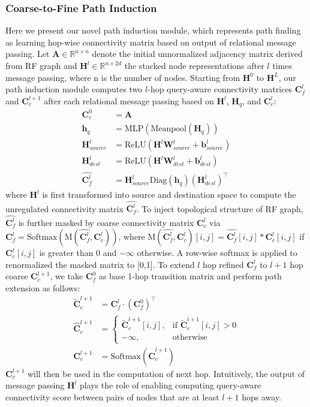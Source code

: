 \subsubsection{Coarse-to-Fine Path Induction}
Here we present our novel path induction module, which represents path finding as learning hop-wise connectivity matrix based on output of relational message passing.
Let $\bm{A}\in \mathbb{R}^{n\times n}$ denote the initial unnormalized adjacency matrix derived from RF graph and $\bm{H}^l\in \mathbb{R}^{n\times 2d}$ the stacked node representations after $l$ times message passing, where n is the number of nodes. Starting from $\bm{H}^0$ to $\bm{H}^L$, our path induction module computes two $l$-hop query-aware connectivity matrices $\bm{C}_{f}^l$ and $\bm{C}_c^{l+1}$ after each relational message passing based on $\bm{H}^{l}$, $\bm{H}_q$, and $\bm{C}_c^{l}$:
\begin{align}
	\bm{C}_c^0 &= \bm{A}\\
	\bm{h}_q &= \text{MLP}(\text{Meanpool}(\bm{H}_q)) \\ 
	\bm{H}_{source}^l &= \text{ReLU}(\bm{H}^l\bm{W}_{source}^l+\bm{b}_{source}^l)\\
	\bm{H}_{dest}^l &= \text{ReLU}(\bm{H}^l\bm{W}_{dest}^l+\bm{b}_{dest}^l)\\
	\hat{\bm{C}_f^l} &=  \bm{H}_{source}^l \text{Diag}(\bm{h}_q) (\bm{H}_{dest}^l)^\top
\end{align}
where $\bm{H}^l$ is first transformed into source and destination space to compute the unregulated connectivity matrix $\hat{\bm{C}_f^l}$. To inject topological structure of RF graph, $\hat{\bm{C}_f^l}$ is further masked by coarse connectivity matrix $\bm{C}_c^{l}$ via $\bm{C}_{f}^l=\text{Softmax}(\text{M}(\hat{\bm{C}_f^l}, \bm{C}_c^{l}))$, where $\text{M}(\hat{\bm{C}_f^l}, \bm{C}_c^{l})[i,j]=\hat{\bm{C}_f^l}[i,j]*\bm{C}_c^{l}[i,j]$ if $\bm{C}_c^{l}[i,j]$ is greater than 0 and $-\infty$ otherwise. A row-wise softmax is applied to renormalized the masked matrix to [0,1]. To extend $l$ hop refined $\bm{C}_f^l$ to $l+1$ hop coarse $\bm{C}_c^{l+1}$, we take $\bm{C}_f^0$ as base 1-hop transition matrix and perform path extension as follows:
\begin{align}
	\tilde{\bm{C}}_c^{l+1} &= \bm{C}_f^l\cdot (\bm{C}_f^0)^\top\\
	\hat{\bm{C}}_c^{l+1} &=
	\begin{cases} 
\tilde{\bm{C}}_c^{l+1}[i,j],  & \text{if } \tilde{\bm{C}}_c^{l+1}[i,j]>0\\
-\infty, & \text{otherwise}
\end{cases} \\
	\bm{C}_c^{l+1} &= \text{Softmax}(\hat{\bm{C}}_c^{l+1})
\end{align}
$\bm{C}_c^{l+1}$ will then be used in the computation of next hop. Intuitively, the output of message passing $\bm{H}^l$ plays the role of enabling computing query-aware connectivity score between pairs of nodes that are at least $l+1$ hops away.

